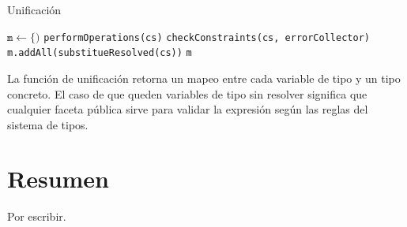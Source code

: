 \begin{algorithm}\captionsetup{labelsep=newline}
  \centering
  \caption{Unificación}
  \label{pseudouni}
    \begin{algorithmic}[1]
          \State $\mathtt{m\gets \{)}$
            \State \texttt{performOperations(cs)}
            \State \texttt{checkConstraints(cs, errorCollector)}
            \State \texttt{m.addAll(substitueResolved(cs))}
          \EndWhile
          \State \Return \texttt{m}
      \EndFunction
    \end{algorithmic}
\end{algorithm}
\clearpage
La función de unificación retorna un mapeo entre cada variable de tipo y un tipo concreto. El caso de que queden variables de tipo sin resolver significa que cualquier faceta pública sirve para validar la expresión según las reglas del sistema de tipos.

\section*{Resumen}
Por escribir.
